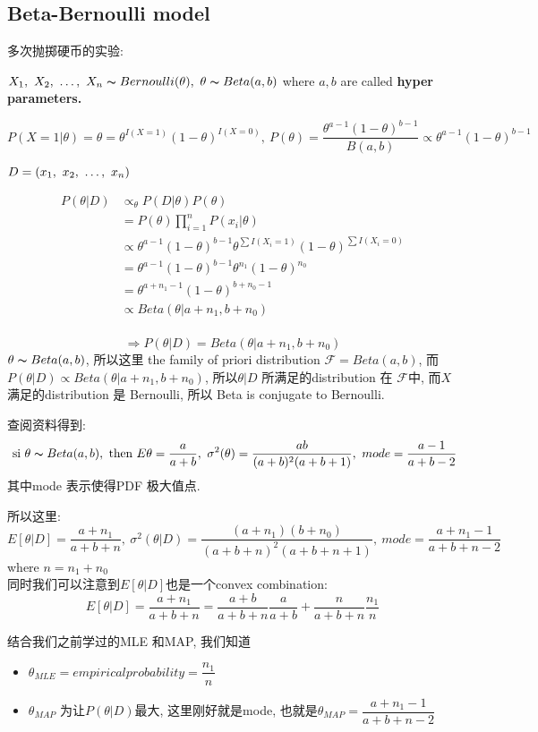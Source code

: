 \documentclass{article}
\begin{document}
\subsection{Beta-Bernoulli model}
多次抛掷硬币的实验:

$\vector{X} \obey Bernoulli(\theta),\ \theta \obey Beta(a,b)$ where $a,b$ are called \textbf{hyper parameters.}

$P(X = 1|\theta) = \theta = \theta^{I(X=1)} (1-\theta)^{I(X=0)},\ 
P(\theta) = \dfrac{\theta^{a-1}(1-\theta)^{b-1}}{B(a,b)} \propto \theta^{a-1}(1-\theta)^{b-1}$

$D = (x_1,~x_2,~\ldots,~x_n)$

$$
\begin{aligned}
P(\theta | D) 
& \propto_{\theta} P(D|\theta)P(\theta)\\
& = P(\theta) \prod_{i=1}^n P(x_i|\theta)\\
& \propto \theta^{a-1}(1-\theta)^{b-1} \theta^{\sum I(X_i=1)} (1-\theta)^{\sum I(X_i=0)}\\
& = \theta^{a-1}(1-\theta)^{b-1} \theta^{n_1} (1-\theta)^{n_0}\\
& = \theta^{a + n_1 - 1} (1-\theta)^{b + n_0 -1}\\
& \propto Beta(\theta | a + n_1, b + n_0)\\
\end{aligned}
$$

$$\Rightarrow P(\theta | D) = Beta(\theta | a + n_1, b + n_0)$$
$\theta \thicksim{B}eta(a,b)$, 所以这里 the family of priori distribution $\mathcal{F} = Beta(a,b)$, 
而$P(\theta | D) \propto Beta(\theta | a + n_1, b + n_0)$, 所以$\theta|D$ 所满足的distribution 在 $\mathcal{F}$中, 而$X$ 满足的distribution 是 Bernoulli,
所以 Beta is conjugate to Bernoulli.

查阅资料得到:\\
$$\textrm{\ si } \theta \thicksim{B}eta(a,b), \textrm{ then } E\theta = \dfrac{a}{a+b},\ \sigma^2(\theta) = \dfrac{ab}{(a+b)^2(a+b+1)},\ mode = \dfrac{a-1}{a+b-2}$$
其中mode 表示使得PDF 极大值点.

所以这里:
$$E[\theta|D] = \dfrac{a + n_1}{a + b + n},\ \sigma^2(\theta|D) = \dfrac{(a + n_1)(b + n_0) }{(a + b + n)^2(a +b + n +1)},\ mode = \dfrac{a + n_1 -1}{a + b + n -2}$$
where $n = n_1 + n_0$\\
同时我们可以注意到$E[\theta|D]$也是一个convex combination:
$$E[\theta|D] = \dfrac{a + n_1}{a + b +n} = \dfrac{a+b}{a+b+n} \dfrac{a}{a+b} + \dfrac{n}{a+b+n} \dfrac{n_1}{n}$$

结合我们之前学过的MLE 和MAP, 我们知道
\begin{itemize}
\item $\theta_{MLE} = empirical probability = \dfrac{n_1}{n}$
\item $\theta_{MAP}$ 为让$P(\theta|D)$最大, 这里刚好就是mode, 也就是$\theta_{MAP} = \dfrac{a+n_1 - 1}{a+b+n-2}$
\end{itemize}
\end{document}

